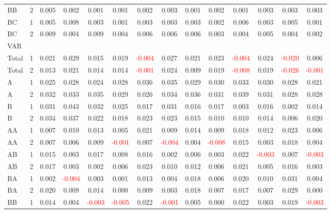 \begin{table}[H]
{\begin{tabular}{llcccccccccccc}
BB & 2 & 0.005 & 0.002 & 0.001 & 0.001 & 0.002 & 0.003 & 0.001 & 0.002 & 0.001 & 0.003 & 0.003 & 0.003\\
BC & 1 & 0.005 & 0.008 & 0.003 & 0.001 & 0.003 & 0.003 & 0.003 & 0.002 & 0.006 & 0.003 & 0.005 & 0.001\\
BC & 2 & 0.009 & 0.004 & 0.009 & 0.004 & 0.006 & 0.006 & 0.006 & 0.003 & 0.004 & 0.005 & 0.004 & 0.002\\
\hline
VAR &  &  &  &  &  &  &  &  &  &  &  &  & \\
\hline
Total & 1 & 0.021 & 0.029 & 0.015 & 0.019 & \textcolor{red}{-0.004} & 0.027 & 0.021 & 0.023 & \textcolor{red}{-0.004} & 0.024 & \textcolor{red}{-0.020} & 0.006\\
Total & 2 & 0.013 & 0.021 & 0.014 & 0.014 & \textcolor{red}{-0.001} & 0.024 & 0.009 & 0.019 & \textcolor{red}{-0.008} & 0.019 & \textcolor{red}{-0.026} & \textcolor{red}{-0.001}\\
A & 1 & 0.025 & 0.028 & 0.024 & 0.028 & 0.036 & 0.035 & 0.029 & 0.030 & 0.033 & 0.030 & 0.028 & 0.021\\
A & 2 & 0.032 & 0.033 & 0.035 & 0.029 & 0.026 & 0.034 & 0.036 & 0.031 & 0.039 & 0.031 & 0.028 & 0.028\\
B & 1 & 0.031 & 0.043 & 0.032 & 0.025 & 0.017 & 0.031 & 0.016 & 0.017 & 0.003 & 0.016 & 0.002 & 0.014\\
B & 2 & 0.034 & 0.037 & 0.022 & 0.018 & 0.023 & 0.023 & 0.015 & 0.010 & 0.010 & 0.014 & 0.006 & 0.020\\
AA & 1 & 0.007 & 0.010 & 0.013 & 0.005 & 0.021 & 0.009 & 0.014 & 0.009 & 0.018 & 0.012 & 0.023 & 0.006\\
AA & 2 & 0.007 & 0.006 & 0.009 & \textcolor{red}{-0.001} & 0.007 & \textcolor{red}{-0.004} & 0.004 & \textcolor{red}{-0.008} & 0.015 & 0.003 & 0.018 & 0.004\\
AB & 1 & 0.015 & 0.003 & 0.017 & 0.008 & 0.016 & 0.002 & 0.006 & 0.003 & 0.022 & \textcolor{red}{-0.003} & 0.007 & \textcolor{red}{-0.003}\\
AB & 2 & 0.017 & 0.003 & 0.002 & 0.006 & 0.023 & 0.010 & 0.012 & 0.006 & 0.021 & 0.005 & 0.016 & 0.003\\
BA & 1 & 0.002 & \textcolor{red}{-0.004} & 0.003 & 0.001 & 0.013 & 0.004 & 0.018 & 0.006 & 0.020 & 0.010 & 0.031 & 0.004\\
BA & 2 & 0.020 & 0.009 & 0.014 & 0.000 & 0.009 & 0.003 & 0.018 & 0.007 & 0.017 & 0.007 & 0.029 & 0.000\\
BB & 1 & 0.014 & 0.004 & \textcolor{red}{-0.003} & \textcolor{red}{-0.005} & 0.022 & \textcolor{red}{-0.001} & 0.005 & 0.000 & 0.022 & 0.003 & 0.019 & \textcolor{red}{-0.003}\\

\end{tabular}}
\end{table}
